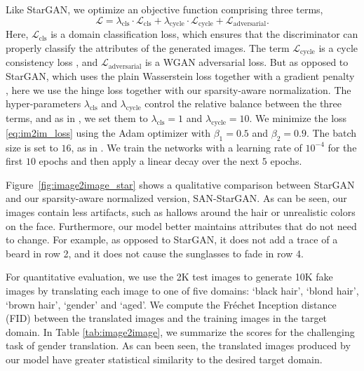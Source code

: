Like StarGAN, we optimize an objective function comprising three terms,
\begin{equation}\label{eq:im2im_loss}
\mathcal{L} = \lambda_{\text{cls}} \cdot \mathcal{L}_{\text{cls}} + \lambda_{\text{cycle}} \cdot \mathcal{L}_{\text{cycle}} + \mathcal{L}_{\text{adversarial}}.
\end{equation}
Here, $\mathcal{L}_{\text{cls}}$ is a domain classification loss, which ensures that the discriminator can properly classify the attributes of the generated images. The term $\mathcal{L}_{\text{cycle}}$ is a cycle consistency loss \cite{zhu2017unpaired}, and $\mathcal{L}_{\text{adversarial}}$ is a WGAN adversarial loss. But as opposed to StarGAN, which uses the plain Wasserstein loss together with a gradient penalty \cite{gulrajani2017improved}, here we use the hinge loss together with our sparsity-aware normalization. The hyper-parameters $\lambda_{\text{cls}}$ and $\lambda_{\text{cycle}}$ control the relative balance between the three terms, and as in \cite{stargan}, we set them to $\lambda_{\text{cls}}=1$ and $\lambda_{\text{cycle}}=10$. We minimize the loss \eqref{eq:im2im_loss} using the Adam optimizer \cite{adam} with $\beta_1=0.5$ and $\beta_2=0.9$. The batch size is set to $16$, as in \cite{stargan}. We train the networks with a learning rate of $10^{-4}$ for the first $10$ epochs and then apply a linear decay over the next $5$ epochs.


Figure~\ref{fig:image2image_star} shows a qualitative comparison between StarGAN and our sparsity-aware normalized version, SAN-StarGAN. As can be seen, our images contain less artifacts, such as hallows around the hair or unrealistic colors on the face. Furthermore, our model better maintains attributes that do not need to change. For example, as opposed to StarGAN, it does not add a trace of a beard in row 2, and it does not cause the sunglasses to fade in row 4.


For quantitative evaluation, we use the 2K test images to generate 10K fake images by translating each image to one of five domains: `black hair', `blond hair', `brown hair', `gender' and `aged'. We compute the Fr\'echet Inception distance (FID) \cite{heusel2017gans} between the translated images and the training images in the target domain. In Table \ref{tab:image2image}, we summarize the scores for the challenging task of gender translation. As can been seen, the translated images produced by our model have greater statistical similarity to the desired target domain. 



